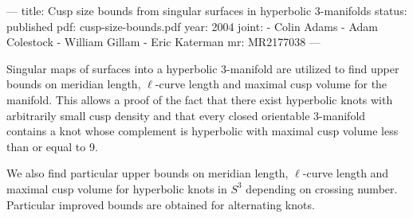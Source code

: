 ---
title: Cusp size bounds from singular surfaces in hyperbolic 3-manifolds
status: published
pdf: cusp-size-bounds.pdf
year: 2004
joint:
  - Colin Adams
  - Adam Colestock
  - William Gillam
  - Eric Katerman
mr: MR2177038
---

Singular maps of surfaces into a hyperbolic 3-manifold are utilized to find upper bounds on meridian length, $\ell$-curve length and maximal cusp volume for the manifold. This allows a proof of the fact that there exist hyperbolic knots with arbitrarily small cusp density and that every closed orientable 3-manifold contains a knot whose complement is hyperbolic with maximal cusp volume less than or equal to 9.

We also find particular upper bounds on meridian length, $\ell$-curve length and maximal cusp volume for hyperbolic knots in $S^3$ depending on crossing number. Particular improved bounds are obtained for alternating knots.
